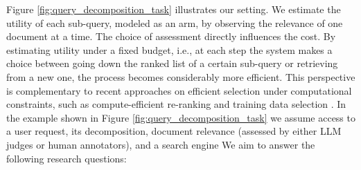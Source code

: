 Figure \ref{fig:query_decomposition_task} illustrates our setting. We estimate the utility of each sub-query, modeled as an arm, by observing the relevance of one document at a time. The choice of assessment directly influences the cost. By estimating utility under a fixed budget, i.e., at each step the system makes a choice between going down the ranked list of a certain sub-query or retrieving from a new one, the process becomes considerably more efficient. This perspective is complementary to recent approaches on efficient selection under computational constraints, such as compute-efficient re-ranking \citep{SetwiseInsertion2024} and training data selection \citep{petcu2024efficientdataselectionemploying}. In the example shown in Figure \ref{fig:query_decomposition_task} %
we assume access to a user request, its decomposition, document relevance (assessed by either LLM judges or human annotators), and a search engine %
We aim to answer the following research questions:





